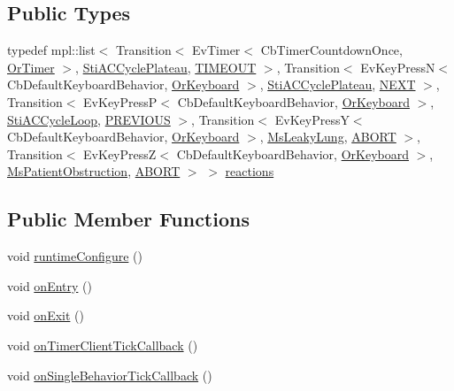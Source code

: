 \subsection*{Public Types}
\begin{DoxyCompactItemize}
\item 
typedef mpl\+::list$<$ Transition$<$ Ev\+Timer$<$ Cb\+Timer\+Countdown\+Once, \hyperlink{classsm__respira__1_1_1OrTimer}{Or\+Timer} $>$, \hyperlink{structsm__respira__1_1_1ac__cycle__inner__states_1_1StiACCyclePlateau}{Sti\+A\+C\+Cycle\+Plateau}, \hyperlink{structsm__respira__1_1_1ac__cycle__inner__states_1_1StiACCycleInspire_1_1TIMEOUT}{T\+I\+M\+E\+O\+UT} $>$, Transition$<$ Ev\+Key\+PressN$<$ Cb\+Default\+Keyboard\+Behavior, \hyperlink{classsm__respira__1_1_1OrKeyboard}{Or\+Keyboard} $>$, \hyperlink{structsm__respira__1_1_1ac__cycle__inner__states_1_1StiACCyclePlateau}{Sti\+A\+C\+Cycle\+Plateau}, \hyperlink{structsm__respira__1_1_1ac__cycle__inner__states_1_1StiACCycleInspire_1_1NEXT}{N\+E\+XT} $>$, Transition$<$ Ev\+Key\+PressP$<$ Cb\+Default\+Keyboard\+Behavior, \hyperlink{classsm__respira__1_1_1OrKeyboard}{Or\+Keyboard} $>$, \hyperlink{structsm__respira__1_1_1ac__cycle__inner__states_1_1StiACCycleLoop}{Sti\+A\+C\+Cycle\+Loop}, \hyperlink{structsm__respira__1_1_1ac__cycle__inner__states_1_1StiACCycleInspire_1_1PREVIOUS}{P\+R\+E\+V\+I\+O\+US} $>$, Transition$<$ Ev\+Key\+PressY$<$ Cb\+Default\+Keyboard\+Behavior, \hyperlink{classsm__respira__1_1_1OrKeyboard}{Or\+Keyboard} $>$, \hyperlink{classsm__respira__1_1_1MsLeakyLung}{Ms\+Leaky\+Lung}, \hyperlink{classABORT}{A\+B\+O\+RT} $>$, Transition$<$ Ev\+Key\+PressZ$<$ Cb\+Default\+Keyboard\+Behavior, \hyperlink{classsm__respira__1_1_1OrKeyboard}{Or\+Keyboard} $>$, \hyperlink{classsm__respira__1_1_1MsPatientObstruction}{Ms\+Patient\+Obstruction}, \hyperlink{classABORT}{A\+B\+O\+RT} $>$ $>$ \hyperlink{structsm__respira__1_1_1ac__cycle__inner__states_1_1StiACCycleInspire_ab4fe7e4f91d31c956264fd09e571440f}{reactions}
\end{DoxyCompactItemize}
\subsection*{Public Member Functions}
\begin{DoxyCompactItemize}
\item 
void \hyperlink{structsm__respira__1_1_1ac__cycle__inner__states_1_1StiACCycleInspire_a63a39b32656ff827fd94005e55f4e125}{runtime\+Configure} ()
\item 
void \hyperlink{structsm__respira__1_1_1ac__cycle__inner__states_1_1StiACCycleInspire_acec3c59ecc654ca66e8dd60a1ee78f3e}{on\+Entry} ()
\item 
void \hyperlink{structsm__respira__1_1_1ac__cycle__inner__states_1_1StiACCycleInspire_abbce3a32ffc162e55b070a501d26ec9e}{on\+Exit} ()
\item 
void \hyperlink{structsm__respira__1_1_1ac__cycle__inner__states_1_1StiACCycleInspire_a67c8606f4087ff72afdc46ff7b95e565}{on\+Timer\+Client\+Tick\+Callback} ()
\item 
void \hyperlink{structsm__respira__1_1_1ac__cycle__inner__states_1_1StiACCycleInspire_acf245ae92e6c56c1b1c8a09608d9b0fd}{on\+Single\+Behavior\+Tick\+Callback} ()
\end{DoxyCompactItemize}
